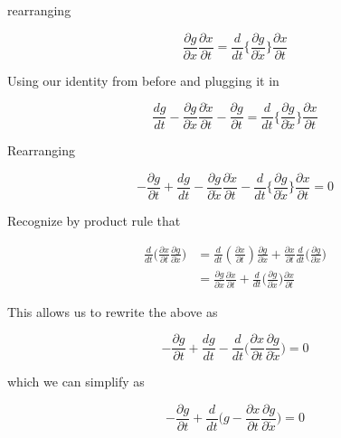 \documentclass[11pt,letterpaper,onecolumn,notitlepage]{article}
\begin{document}
rearranging

\begin{equation*}
  \frac{\partial{}g}{\partial{}x}\frac{\partial{}x}{\partial{}t}=\frac{d}{dt}\biggr\{\frac{\partial{}g}{\partial\dot{x}}\biggr\}\frac{\partial{}x}{\partial{}t}
\end{equation*}

Using our identity from before and plugging it in

\begin{equation*}
  \frac{dg}{dt}-\frac{\partial{}g}{\partial\dot{x}}\frac{\partial\dot{x}}{\partial{}t}-\frac{\partial{}g}{\partial{}t}=\frac{d}{dt}\biggr\{\frac{\partial{}g}{\partial\dot{x}}\biggr\}\frac{\partial{}x}{\partial{}t}
\end{equation*}

Rearranging

\begin{equation*}
-\frac{\partial{}g}{\partial{}t}+\frac{dg}{dt}-\frac{\partial{}g}{\partial\dot{x}}\frac{\partial\dot{x}}{\partial{}t}-\frac{d}{dt}\biggr\{\frac{\partial{}g}{\partial\dot{x}}\biggr\}\frac{\partial{}x}{\partial{}t}=0
\end{equation*}

Recognize by product rule that

\begin{align*}
  \frac{d}{dt}\biggr(\frac{\partial{}x}{\partial{}t}\frac{\partial{}g}{\partial\dot{x}}\biggr)&=
  \frac{d}{dt}\left(\frac{\partial{}x}{\partial{}t}\right)\frac{\partial{}g}{\partial\dot{x}}+\frac{\partial{}x}{\partial{}t}\frac{d}{dt}\biggr(\frac{\partial{}g}{\partial\dot{x}}\biggr) \\
  &=\frac{\partial{}g}{\partial\dot{x}}\frac{\partial\dot{x}}{\partial{}t}+\frac{d}{dt}\biggr(\frac{\partial{}g}{\partial\dot{x}}\biggr)\frac{\partial{}x}{\partial{}t}
\end{align*}

This allows us to rewrite the above as

\begin{equation*}
  -\frac{\partial{}g}{\partial{}t}+\frac{dg}{dt}-\frac{d}{dt}\biggr(\frac{\partial{}x}{\partial{}t}\frac{\partial{}g}{\partial\dot{x}}\biggr)=0
\end{equation*}

which we can simplify as

\begin{equation*}
  -\frac{\partial{}g}{\partial{}t}+\frac{d}{dt}\biggr(g-\frac{\partial{}x}{\partial{}t}\frac{\partial{}g}{\partial\dot{x}}\biggr)=0
\end{equation*}
\end{document}
